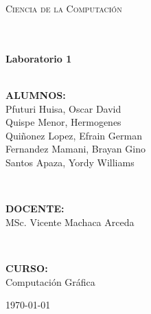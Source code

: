 \documentclass[11pt]{article}
\begin{document}
\begin{center}
\begin{minipage}{0.9\textwidth} 
\begin{center}																					%
\textsc{\LARGE Ciencia de la Computación}
\end{center}
\end{minipage}\\[0.5cm]
 			\vspace*{1cm}																		%
\HRule \\[0.4cm]																	%
{ \huge \bfseries Laboratorio 1
}\\[0.4cm]	%
\HRule \\[1.5cm]																	%
\begin{minipage}{0.46\textwidth}													%
\begin{flushleft} \large															%
\centering

\textbf{ALUMNOS:}\\
Pfuturi Huisa, Oscar David\\
Quispe Menor, Hermogenes\\
Quiñonez Lopez, Efrain German\\
Fernandez Mamani, Brayan Gino\\
Santos Apaza, Yordy Williams

\	\vfill

\textbf{DOCENTE:} \\
MSc. Vicente Machaca Arceda

\	\vfill

\textbf{CURSO:}\\
Computación Gráfica

\end{flushleft}																		%
\end{minipage}		
\begin{minipage}{0.70\textwidth}		
\vspace{-0.6cm}											%
\end{minipage}	
\vspace*{1cm}
 	
\vspace{3cm} 																				
\begin{center}																					
{\large \today}																	%
 			\end{center}												  						
\end{center}							 								\newpage
\newpage																
\end{document}
